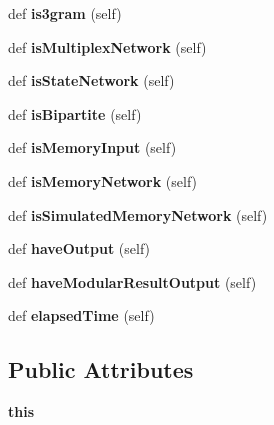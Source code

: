 \begin{DoxyCompactItemize}
\mbox{\label{classinfomap_1_1Config_a76c9889e8c26a2d95a9c840c1bba3258}} 
def {\bfseries is3gram} (self)
\item 
\mbox{\label{classinfomap_1_1Config_a684295975f4cb8ffc96190149a3f66b7}} 
def {\bfseries is\+Multiplex\+Network} (self)
\item 
\mbox{\label{classinfomap_1_1Config_a491e8f5edb60037ca45dad9b07fd6848}} 
def {\bfseries is\+State\+Network} (self)
\item 
\mbox{\label{classinfomap_1_1Config_a6edcf9b0bc39811921a441cdef860762}} 
def {\bfseries is\+Bipartite} (self)
\item 
\mbox{\label{classinfomap_1_1Config_a9a0ef233c05f8fe6bfa8e7500602e9ea}} 
def {\bfseries is\+Memory\+Input} (self)
\item 
\mbox{\label{classinfomap_1_1Config_aed260c8acfe129d948edbe667c49af07}} 
def {\bfseries is\+Memory\+Network} (self)
\item 
\mbox{\label{classinfomap_1_1Config_ab873ffa4b740aed9d658ebc25327de06}} 
def {\bfseries is\+Simulated\+Memory\+Network} (self)
\item 
\mbox{\label{classinfomap_1_1Config_a1b81fdcdc2621af3f72a75515e7a1006}} 
def {\bfseries have\+Output} (self)
\item 
\mbox{\label{classinfomap_1_1Config_a76660a07cca9dd1bf657da17529ff9cb}} 
def {\bfseries have\+Modular\+Result\+Output} (self)
\item 
\mbox{\label{classinfomap_1_1Config_a4f029e208d5843dc3d12853adb52980c}} 
def {\bfseries elapsed\+Time} (self)
\end{DoxyCompactItemize}
\subsection*{Public Attributes}
\begin{DoxyCompactItemize}
\item 
\mbox{\label{classinfomap_1_1Config_a30232a5dbc6ededd22af8338d558bd18}} 
{\bfseries this}
\end{DoxyCompactItemize}
